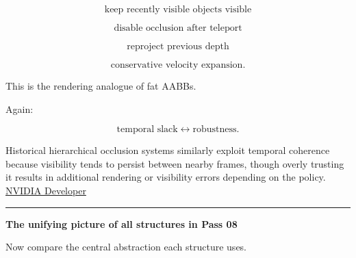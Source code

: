 \[
\text{keep recently visible objects visible}
\]

\[
\text{disable occlusion after teleport}
\]

\[
\text{reproject previous depth}
\]

\[
\text{conservative velocity expansion}.
\]

This is the rendering analogue of fat AABBs.

Again:

\[
\text{temporal slack}
\leftrightarrow
\text{robustness}.
\]

Historical hierarchical occlusion systems similarly exploit temporal coherence because visibility tends to persist between nearby frames, though overly trusting it results in additional rendering or visibility errors depending on the policy. \href{https://developer.nvidia.com/gpugems/gpugems2/part-i-geometric-complexity/chapter-6-hardware-occlusion-queries-made-useful?utm_source=chatgpt.com}{NVIDIA Developer}

\begin{center}\rule{0.5\linewidth}{0.5pt}\end{center}

\textbf{The unifying picture of all structures in Pass 08}

Now compare the central abstraction each structure uses.

